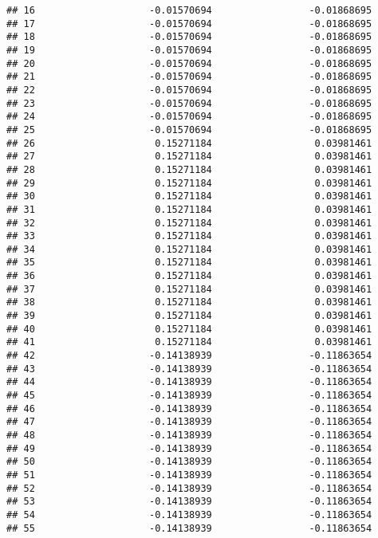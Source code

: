 \documentclass[]{article}
\begin{document}
\begin{verbatim}
## 16                    -0.01570694                 -0.01868695
## 17                    -0.01570694                 -0.01868695
## 18                    -0.01570694                 -0.01868695
## 19                    -0.01570694                 -0.01868695
## 20                    -0.01570694                 -0.01868695
## 21                    -0.01570694                 -0.01868695
## 22                    -0.01570694                 -0.01868695
## 23                    -0.01570694                 -0.01868695
## 24                    -0.01570694                 -0.01868695
## 25                    -0.01570694                 -0.01868695
## 26                     0.15271184                  0.03981461
## 27                     0.15271184                  0.03981461
## 28                     0.15271184                  0.03981461
## 29                     0.15271184                  0.03981461
## 30                     0.15271184                  0.03981461
## 31                     0.15271184                  0.03981461
## 32                     0.15271184                  0.03981461
## 33                     0.15271184                  0.03981461
## 34                     0.15271184                  0.03981461
## 35                     0.15271184                  0.03981461
## 36                     0.15271184                  0.03981461
## 37                     0.15271184                  0.03981461
## 38                     0.15271184                  0.03981461
## 39                     0.15271184                  0.03981461
## 40                     0.15271184                  0.03981461
## 41                     0.15271184                  0.03981461
## 42                    -0.14138939                 -0.11863654
## 43                    -0.14138939                 -0.11863654
## 44                    -0.14138939                 -0.11863654
## 45                    -0.14138939                 -0.11863654
## 46                    -0.14138939                 -0.11863654
## 47                    -0.14138939                 -0.11863654
## 48                    -0.14138939                 -0.11863654
## 49                    -0.14138939                 -0.11863654
## 50                    -0.14138939                 -0.11863654
## 51                    -0.14138939                 -0.11863654
## 52                    -0.14138939                 -0.11863654
## 53                    -0.14138939                 -0.11863654
## 54                    -0.14138939                 -0.11863654
## 55                    -0.14138939                 -0.11863654

\end{verbatim}
\end{document}
